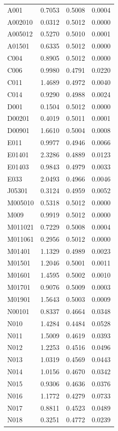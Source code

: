 \documentclass{article}
\begin{document}
\begin{longtable}{|l|c|c|c|}
A001 & 0.7053 & 0.5008 & 0.0004 \\
A002010 & 0.0312 & 0.5012 & 0.0000 \\
A005012 & 0.5270 & 0.5010 & 0.0001 \\
A01501 & 0.6335 & 0.5012 & 0.0000 \\
C004 & 0.8905 & 0.5012 & 0.0000 \\
C006 & 0.9980 & 0.4791 & 0.0220 \\
C011 & 1.4689 & 0.4972 & 0.0040 \\
C014 & 0.9290 & 0.4988 & 0.0024 \\
D001 & 0.1504 & 0.5012 & 0.0000 \\
D00201 & 0.4019 & 0.5011 & 0.0001 \\
D00901 & 1.6610 & 0.5004 & 0.0008 \\
E011 & 0.9977 & 0.4946 & 0.0066 \\
E01401 & 2.3286 & 0.4889 & 0.0123 \\
E01403 & 0.9843 & 0.4979 & 0.0033 \\
E033 & 2.0493 & 0.4966 & 0.0046 \\
J05301 & 0.3124 & 0.4959 & 0.0052 \\
M005010 & 0.5318 & 0.5012 & 0.0000 \\
M009 & 0.9919 & 0.5012 & 0.0000 \\
M011021 & 0.7229 & 0.5008 & 0.0004 \\
M011061 & 0.2956 & 0.5012 & 0.0000 \\
M01401 & 1.1329 & 0.4989 & 0.0023 \\
M01501 & 1.2046 & 0.5001 & 0.0011 \\
M01601 & 1.4595 & 0.5002 & 0.0010 \\
M01701 & 0.9076 & 0.5009 & 0.0003 \\
M01901 & 1.5643 & 0.5003 & 0.0009 \\
N00101 & 0.8337 & 0.4664 & 0.0348 \\
N010 & 1.4284 & 0.4484 & 0.0528 \\
N011 & 1.5009 & 0.4619 & 0.0393 \\
N012 & 1.2253 & 0.4516 & 0.0496 \\
N013 & 1.0319 & 0.4569 & 0.0443 \\
N014 & 1.0156 & 0.4670 & 0.0342 \\
N015 & 0.9306 & 0.4636 & 0.0376 \\
N016 & 1.1772 & 0.4279 & 0.0733 \\
N017 & 0.8811 & 0.4523 & 0.0489 \\
N018 & 0.3251 & 0.4772 & 0.0239 \\

\end{longtable}
\end{document}
